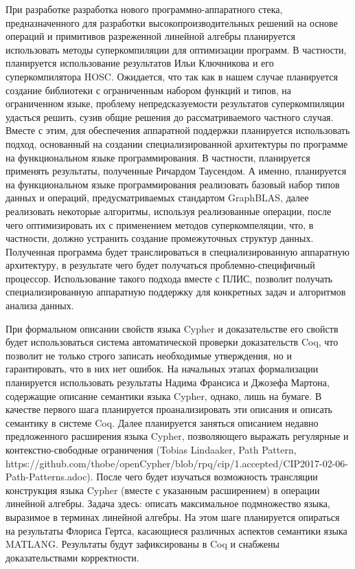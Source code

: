 \documentclass[12pt]{article}  %
\theoremstyle{remark}
\begin{document}
При разработке разработка нового программно-аппаратного стека, предназначенного для разработки высокопроизводительных решений на основе операций и примитивов разреженной линейной алгебры планируется использовать методы суперкомпиляции для оптимизации программ. В частности, планируется использование результатов Ильи Ключникова и его суперкомпилятора HOSC. Ожидается, что так как в нашем случае планируется создание библиотеки с ограниченным набором функций и типов, на ограниченном языке, проблему непредсказуемости результатов суперкомпиляции удасться решить, сузив общие решения до рассматриваемого частного случая. Вместе с этим, для обеспечения аппаратной поддержки планируется использовать подход, основанный на создании специализированной архитектуры по программе на функциональном языке программирования. В частности, планируется применять результаты, полученные Ричардом Таусендом. А именно, планируется на функциональном языке программирования реализовать базовый набор типов данных и операций, предусматриваемых стандартом GraphBLAS, далее реализовать некоторые алгоритмы, используя реализованные операции, после чего оптимизировать их с применением методов суперкомпеляции, что, в частности, должно устранить создание промежуточных структур данных. Полученная программа будет транслироваться в специализированную аппаратную архитектуру, в результате чего будет получаться проблемно-специфичный процессор. Использование такого подхода вместе с ПЛИС, позволит получать специализированную аппаратную поддержку для конкретных задач и алгоритмов анализа данных.

При формальном описании свойств языка Cypher и доказательстве его свойств будет использоваться система автоматической проверки доказательств Coq, что позволит не только строго записать необходимые утверждения, но и гарантировать, что в них нет ошибок. На начальных этапах формализации планируется использовать результаты Надима Франсиса и Джозефа Мартона, содержащие описание семантики языка Cypher, однако, лишь на бумаге. В качестве первого шага планируется проанализировать эти описания и описать семантику в системе Coq. Далее планируется заняться описанием недавно предложенного расширения языка Cypher, позволяющего выражать регулярные и контекстно-свободные ограничения (Tobias Lindaaker, Path Pattern, https://github.com/thobe/openCypher/blob/rpq/cip/1.accepted/CIP2017-02-06-Path-Patterns.adoc). После чего будет изучаться возможность трансляции конструкция языка Cypher (вместе с указанным расширением) в операции линейной алгебры. Задача здесь: описать максимальное подмножество языка, выразимое в терминах линейной алгебры. На этом шаге планируется опираться на результаты Флориса Гертса, касающиеся различных аспектов семантики языка MATLANG. Результаты будут зафиксированы в Coq и снабжены доказательствами корректности. 
\end{document}
